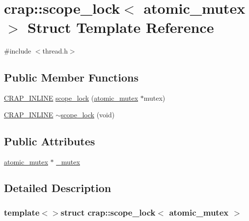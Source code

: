 \hypertarget{structcrap_1_1scope__lock_3_01atomic__mutex_01_4}{}\section{crap\+:\+:scope\+\_\+lock$<$ atomic\+\_\+mutex $>$ Struct Template Reference}
\label{structcrap_1_1scope__lock_3_01atomic__mutex_01_4}


{\ttfamily \#include $<$thread.\+h$>$}

\subsection*{Public Member Functions}
\begin{DoxyCompactItemize}
\item 
\hyperlink{config__x86_8h_a5a40526b8d842e7ff731509998bb0f1c}{C\+R\+A\+P\+\_\+\+I\+N\+L\+I\+N\+E} \hyperlink{structcrap_1_1scope__lock_3_01atomic__mutex_01_4_a1d8e11542c766c438a8328206aaea9e0}{scope\+\_\+lock} (\hyperlink{structcrap_1_1atomic__mutex}{atomic\+\_\+mutex} $\ast$mutex)
\item 
\hyperlink{config__x86_8h_a5a40526b8d842e7ff731509998bb0f1c}{C\+R\+A\+P\+\_\+\+I\+N\+L\+I\+N\+E} \hyperlink{structcrap_1_1scope__lock_3_01atomic__mutex_01_4_a7481f13fcabcd19c252c5b4877dd2b12}{$\sim$scope\+\_\+lock} (void)
\end{DoxyCompactItemize}
\subsection*{Public Attributes}
\begin{DoxyCompactItemize}
\item 
\hyperlink{structcrap_1_1atomic__mutex}{atomic\+\_\+mutex} $\ast$ \hyperlink{structcrap_1_1scope__lock_3_01atomic__mutex_01_4_a84842a0c0f70416a6b5276469ec292ce}{\+\_\+mutex}
\end{DoxyCompactItemize}


\subsection{Detailed Description}
\subsubsection*{template$<$$>$struct crap\+::scope\+\_\+lock$<$ atomic\+\_\+mutex $>$}



